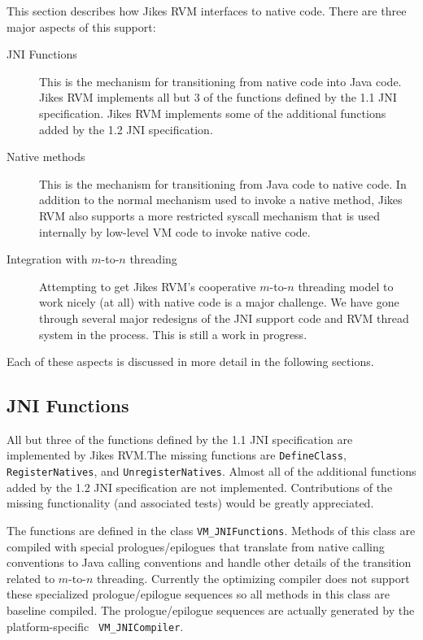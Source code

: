 %

This section describes how Jikes RVM interfaces to native code. There
are three major aspects of this support:
\begin{description}
\item[JNI Functions] This is the mechanism for transitioning from
native code into Java code.  Jikes RVM implements all but 3 of the
functions defined by the 1.1 JNI specification. Jikes RVM implements
some of the additional functions added by the 1.2 JNI
specification.
\item[Native methods] This is the mechanism for transitioning from
Java code to native code. In addition to the normal mechanism used to
invoke a native method, Jikes RVM also supports a more restricted
syscall mechanism that is used internally by low-level VM code to
invoke native code. 
\item[Integration with $m$-to-$n$ threading] Attempting to get Jikes RVM's
cooperative $m$-to-$n$ threading model to work nicely (at all) with native
code is a major challenge. We have gone through several major
redesigns of the JNI support code and RVM thread system in the
process. This is still a work in progress.
\end{description}
Each of these aspects is discussed in more detail in the following
sections. 

\subsection{JNI Functions}
All but three of the functions defined by the 1.1 JNI specification are
implemented by Jikes RVM.\@ The missing functions are {\tt DefineClass},
{\tt RegisterNatives}, and {\tt UnregisterNatives}.  Almost all of the
additional functions added by the 1.2 JNI specification are not
implemented.  Contributions of the missing functionality (and
associated tests) would be greatly appreciated. 

The functions are defined in the class {\tt VM\_JNIFunctions}. Methods
of this class are compiled with special prologues/epilogues that
translate from native calling conventions to Java calling conventions
and handle other details of the transition related to $m$-to-$n$
threading.  Currently the optimizing compiler 
does not support these specialized prologue/epilogue sequences so all
methods in this class are baseline compiled.  The prologue/epilogue
sequences are actually generated by the platform-specific {\tt
VM\_JNICompiler}. 

